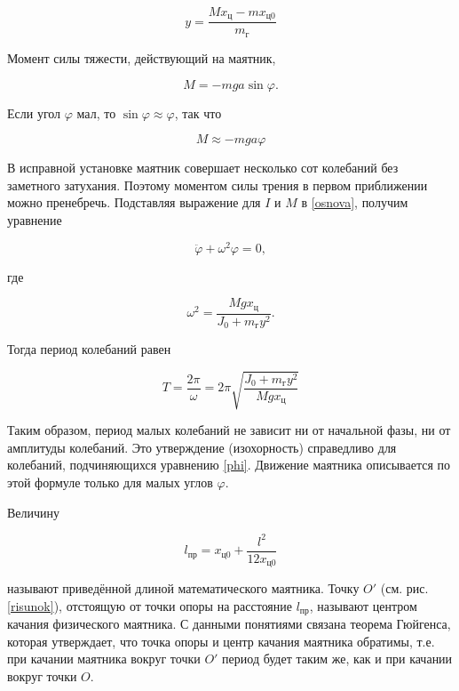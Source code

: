 \documentclass[a4paper,12pt]{article} %
\begin{document}
\begin{equation}
    y=\frac{Mx_\text{ц}-mx_\text{ц0}}{m_\text{г}}
    \label{counterweightCenter}
\end{equation}

Момент силы тяжести, действующий на маятник, 

\begin{equation}
M=-mga\sin\varphi.
\end{equation}

\noindent Если угол $ \varphi $ мал, то $ \sin\varphi\approx\varphi $, так что

\begin{equation}
M\approx-mga\varphi
\end{equation}

\noindent В исправной установке маятник совершает несколько сот колебаний без заметного затухания. Поэтому моментом силы трения в первом приближении можно пренебречь. Подставляя выражение для $ I $ и $ M $ в \eqref{osnova}, получим уравнение

\begin{equation}
\ddot{\varphi}+\omega^2\varphi=0,
\label{phi}
\end{equation}

\noindent где

\begin{equation}
\omega^2=\frac{Mgx_\text{ц}}{J_0+m_\text{г}y^2}.
\end{equation}

Тогда период колебаний равен

\begin{equation}\label{period}
T=\frac{2\pi}{\omega}=2\pi\sqrt{\frac{J_0+m_\text{г}y^2}{Mgx_\text{ц}}}
\end{equation}

Таким образом, период малых колебаний не зависит ни от начальной фазы, ни от амплитуды колебаний. Это утверждение (изохорность) справедливо для колебаний, подчиняющихся уравнению \eqref{phi}. Движение маятника описывается по этой формуле только для малых углов $ \varphi $.

\medskip

Величину

\begin{equation}\label{prLength}
l_\text{пр}=x_\text{ц0}+\frac{l^2}{12x_\text{ц0}}
\end{equation}

называют приведённой длиной математического маятника. Точку $ O' $ (см. рис. \ref{risunok}), отстоящую от точки опоры на расстояние $ l_\text{пр} $, называют центром качания физического маятника. С данными понятиями связана теорема Гюйгенса, которая утверждает, что точка опоры и центр качания маятника обратимы, т.е. при качании маятника вокруг  точки $ O' $ период будет таким же, как и при качании вокруг точки $ O $. 
\end{document}
